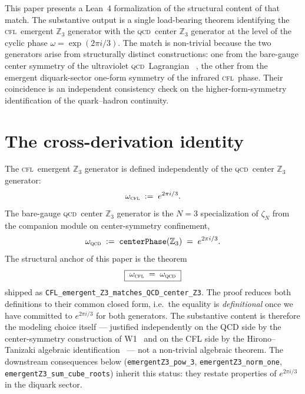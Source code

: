 \documentclass[twocolumn]{revtex4-2}
\newcommand{\CFL}{\textsc{cfl}}
\newcommand{\QCD}{\textsc{qcd}}
\newcommand{\Zthree}{\mathbb{Z}_3}
\begin{document}
This paper presents a Lean~4 formalization of the structural content
of that match. The substantive output is a single load-bearing
theorem identifying the \CFL\ emergent $\Zthree$ generator with the
\QCD\ center $\Zthree$ generator at the level of the cyclic phase
$\omega = \exp(2\pi i / 3)$. The match is non-trivial because the two
generators arise from structurally distinct constructions: one from
the bare-gauge center symmetry of the ultraviolet \QCD\ Lagrangian
~\cite{Polyakov1978}, the other from the emergent diquark-sector
one-form symmetry of the infrared \CFL\ phase. Their coincidence is
an independent consistency check on the higher-form-symmetry
identification of the quark--hadron continuity.

\section{The cross-derivation identity}
\label{sec:cross-derivation}

The \CFL\ emergent $\Zthree$ generator is defined independently of the
\QCD\ center $\Zthree$ generator:
\begin{equation}
\omega_\CFL \;:=\; e^{2 \pi i / 3}.
\label{eq:cfl-omega}
\end{equation}
The bare-gauge \QCD\ center $\Zthree$ generator is the
$N = 3$ specialization of $\zeta_N$ from the companion module on
center-symmetry confinement,
\begin{equation}
\omega_\QCD \;:=\; \texttt{centerPhase}(\Zthree) \;=\; e^{2 \pi i / 3}.
\label{eq:qcd-omega}
\end{equation}
The structural anchor of this paper is the theorem
\begin{equation}
\boxed{\;
\omega_\CFL \;=\; \omega_\QCD
\;}
\end{equation}
shipped as \texttt{CFL\_emergent\_Z3\_matches\_QCD\_center\_Z3}.
The proof reduces both definitions to their common closed form,
i.e.\ the equality is \emph{definitional} once we have committed to
$e^{2\pi i / 3}$ for both generators. The substantive content is
therefore the modeling choice itself --- justified independently
on the QCD side by the center-symmetry construction of
W1~\cite{Polyakov1978,SvetitskyYaffe1982} and on the CFL side by
the Hirono--Tanizaki algebraic
identification~\cite{HironoTanizaki2018} --- not a non-trivial
algebraic theorem. The downstream consequences below
(\texttt{emergentZ3\_pow\_3}, \texttt{emergentZ3\_norm\_one},
\texttt{emergentZ3\_sum\_cube\_roots}) inherit this status:
they restate properties of $e^{2\pi i / 3}$ in the diquark sector.
\end{document}
